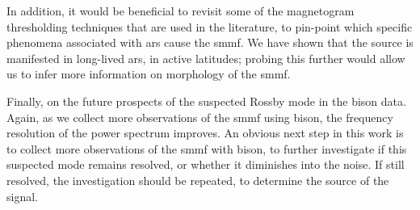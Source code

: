 In addition, it would be beneficial to revisit some of the magnetogram thresholding techniques that are used in the literature, to pin-point which specific phenomena associated with \glspl{ar} cause the \gls{smmf}. We have shown that the source is manifested in long-lived \glspl{ar}, in active latitudes; probing this further would allow us to infer more information on morphology of the \gls{smmf}.

Finally, on the future prospects of the suspected Rossby mode in the \gls{bison} data. Again, as we collect more observations of the \gls{smmf} using \gls{bison}, the frequency resolution of the power spectrum improves. An obvious next step in this work is to collect more observations of the \gls{smmf} with \gls{bison}, to further investigate if this suspected mode remains resolved, or whether it diminishes into the noise. If still resolved, the investigation should be repeated, to determine the source of the signal.